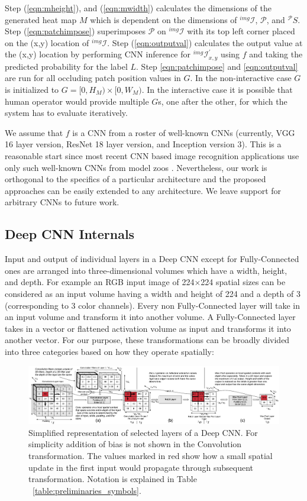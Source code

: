 Step (\ref{eqn:mheight}), and (\ref{eqn:mwidth}) calculates the dimensions of the generated heat map $M$ which is dependent on the dimensions of $^{img}\mathcal{I}$, $\mathcal{P}$, and $^\mathcal{P}S$.
Step (\ref{eqn:patchimpose}) superimposes $\mathcal{P}$ on $^{img}\mathcal{I}$ with its top left corner placed on the (x,y) location of $^{img}\mathcal{I}$.
Step (\ref{eqn:outputval}) calculates the output value at the (x,y) location by performing CNN inference for $^{img}\mathcal{I}^{'}_{x,y}$ using $f$ and taking the predicted probability for the label $L$.
Step \ref{eqn:patchimpose} and \ref{eqn:outputval} are run for all occluding patch position values in $G$.
In the non-interactive case $G$ is initialized to $G = [0, H_M) \times [0, W_M)$.
In the interactive case it is possible that human operator would provide multiple $G$s, one after the other, for which the system has to evaluate iteratively.

We assume that $f$ is a CNN from a roster of well-known CNNs (currently, VGG 16 layer version, ResNet 18 layer version, and Inception version 3).
This is a reasonable start since most recent CNN based image recognition applications use only such well-known CNNs from model zoos \cite{caffemodelzoo, tfmodelzoo}.
Nevertheless, our work is orthogonal to the specifics of a particular architecture and the proposed approaches can be easily extended to any architecture.
We leave support for arbitrary CNNs to future work.

\subsection{Deep CNN Internals}
Input and output of individual layers in a Deep CNN except for Fully-Connected ones are arranged into three-dimensional volumes which have a width, height, and depth.
For example an RGB input image of 224$\times$224 spatial sizes can be considered as an input volume having a width and height of 224 and a depth of 3 (corresponding to 3 color channels).
Every non Fully-Connected layer will take in an input volume and transform it into another volume.
A Fully-Connected layer takes in a vector or flattened activation volume as input and transforms it into another vector.
For our purpose, these transformations can be broadly divided into three categories based on how they operate spatially:

\begin{figure}[t]
\includegraphics[width=\textwidth]{images/cnn_simplified}
\caption{Simplified representation of selected layers of a Deep CNN. For simplicity addition of bias is not shown in the Convolution transformation. The values marked in red show how a small spatial update in the first input would propagate through subsequent transformation. Notation is explained in Table ~\ref{table:preliminaries_symbols}.}
\label{fig:cnn_simplified}
\end{figure}

